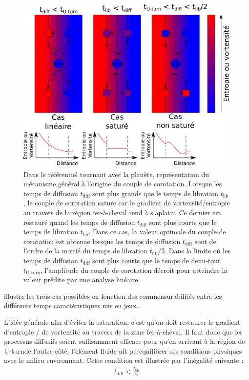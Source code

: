 \begin{figure}[htbp]
\centering
\includegraphics[width=0.75\linewidth]{figure/corotation_principle.pdf}
\caption[État du couple de corotation en fonction des valeurs des temps caractéristiques.]{Dans le référentiel tournant avec la
planète, représentation du mécanisme général à l'origine du couple de corotation. Lorsque les temps de diffusion $t_\text{diff}$
sont plus grands que le temps de libration $t_\text{lib}$, le couple de corotation sature car le gradient de vortensité/entropie
au travers de la région fer-à-cheval tend à s'aplatir. Ce dernier est restauré quand les temps de diffusion $t_\text{diff}$ sont
plus courts que le temps de libration $t_\text{lib}$. Dans ce cas, la valeur optimale du couple de corotation est obtenue
lorsque les temps de diffusion $t_\text{diff}$ sont de l'ordre de la moitié du temps de libration $t_\text{lib}/2$. Dans la
limite où les temps de diffusion $t_\text{diff}$ sont plus courts que le temps de demi-tour $t_\text{U-turn}$, l'amplitude du
couple de corotation décroit pour atteindre la valeur prédite par une analyse linéaire.}\label{fig:corotation_principle}
\end{figure}

 illustre les trois cas possibles en fonction des commensurabilités entre les différents temps caractéristiques mis en jeux.

L'idée générale afin d'éviter la saturation, c'est qu'on doit restaurer le gradient d'entropie / de vortensité au travers de la zone fer-à-cheval. Il faut donc que les processus diffusifs soient suffisamment efficace pour qu'en arrivant à la région de \og U-turn\fg de l'autre côté, l'élément fluide ait pu équilibrer ses conditions physiques avec le milieu environnant. Cette condition est illustrée par l'inégalité suivante : 
\begin{align}
t_\text{diff} < \frac{t_\text{lib}}{2}
\end{align}

